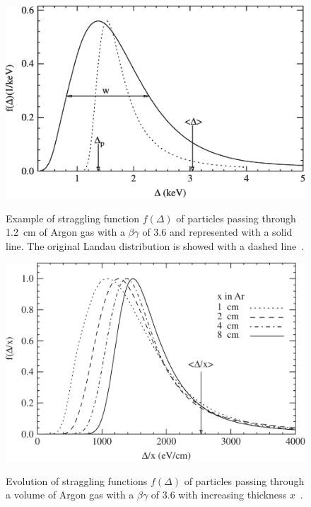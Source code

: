 	\begin{figure}[H]
		\centering
		\includegraphics[width = 0.8\plotwidth]{fig/chapt4/Straggling-gas.pdf}\\
		\caption{\label{fig:straggling-gas} Example of straggling function $f(\Delta)$ of particles passing through \SI{1.2}{cm} of Argon gas with a $\beta\gamma$ of 3.6 and represented with a solid line. The original Landau distribution is showed with a dashed line~\cite{BISCHEL2006}.}
	\end{figure}
	
	\begin{figure}[H]
		\centering
		\includegraphics[width = 0.8\plotwidth]{fig/chapt4/Straggling-gas-thickness.pdf}\\
		\caption{\label{fig:straggling-thickness} Evolution of straggling functions $f(\Delta)$ of particles passing through a volume of Argon gas with a $\beta\gamma$ of 3.6 with increasing thickness $x$~\cite{BISCHEL2006}.}
	\end{figure}
	
